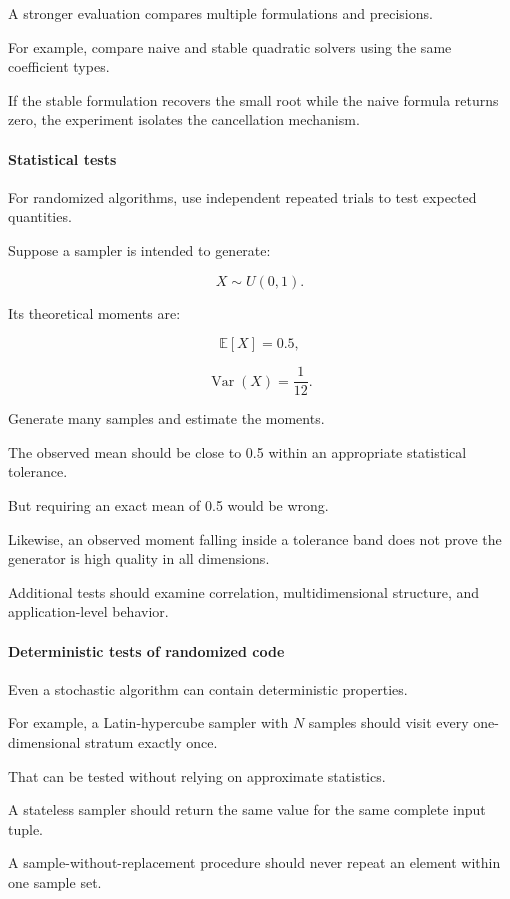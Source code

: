 A stronger evaluation compares multiple formulations and precisions.

For example, compare naive and stable quadratic solvers using the same coefficient types.

If the stable formulation recovers the small root while the naive formula returns zero, the experiment isolates the cancellation mechanism.

\paragraph{Statistical tests}\label{statistical-tests}

For randomized algorithms, use independent repeated trials to test expected quantities.

Suppose a sampler is intended to generate:

\[ X\sim U(0,1). \]

Its theoretical moments are:

\[ \mathbb E[X]=0.5, \]

\[ \operatorname{Var}(X)=\frac1{12}. \]

Generate many samples and estimate the moments.

The observed mean should be close to 0.5 within an appropriate statistical tolerance.

But requiring an exact mean of 0.5 would be wrong.

Likewise, an observed moment falling inside a tolerance band does not prove the generator is high quality in all dimensions.

Additional tests should examine correlation, multidimensional structure, and application-level behavior.

\paragraph{Deterministic tests of randomized code}\label{deterministic-tests-of-randomized-code}

Even a stochastic algorithm can contain deterministic properties.

For example, a Latin-hypercube sampler with \(N\) samples should visit every one-dimensional stratum exactly once.

That can be tested without relying on approximate statistics.

A stateless sampler should return the same value for the same complete input tuple.

A sample-without-replacement procedure should never repeat an element within one sample set.

